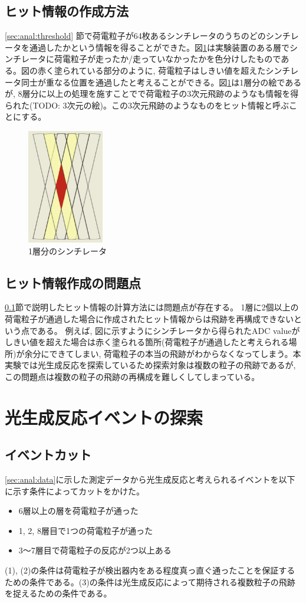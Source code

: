 \subsection{ヒット情報の作成方法}\label{subsec:anal:make_hit}
\ref{sec:anal:threshold} 節で荷電粒子が64枚あるシンチレータのうちのどのシンチレータを通過したかという情報を得ることができた。図\ref{fig:igata01}は実験装置のある層でシンチレータに荷電粒子が走ったか/走っていなかったかを色分けしたものである。図の赤く塗られている部分のように, 荷電粒子はしきい値を超えたシンチレータ同士が重なる位置を通過したと考えることができる。図\ref{fig:igata01}は1層分の絵であるが, 8層分に以上の処理を施すことでで荷電粒子の3次元飛跡のようなも情報を得られた(TODO: 3次元の絵)。この3次元飛跡のようなものをヒット情報と呼ぶことにする。
\begin{figure}[H]
    \centering
    \includegraphics[height=5.0cm]{img/igata_01.png}
    \caption{1層分のシンチレータ}
    \label{fig:igata01}
\end{figure}
\subsection{ヒット情報作成の問題点}
\ref{subsec:anal:make_hit}節で説明したヒット情報の計算方法には問題点が存在する。
1層に2個以上の荷電粒子が通過した場合に作成されたヒット情報からは飛跡を再構成できないという点である。
例えば, 図に示すようにシンチレータから得られたADC valueがしきい値を超えた場合は赤く塗られる箇所(荷電粒子が通過したと考えられる場所)が余分にできてしまい, 荷電粒子の本当の飛跡がわからなくなってしまう。本実験では光生成反応を探索しているため探索対象は複数の粒子の飛跡であるが, この問題点は複数の粒子の飛跡の再構成を難しくしてしまっている。

\section{光生成反応イベントの探索}
\subsection{イベントカット}\label{sec:anal:eventcut}
\ref{sec:anal:data}に示した測定データから光生成反応と考えられるイベントを以下に示す条件によってカットをかけた。
\begin{itemize}
    \item[(1)] 6層以上の層を荷電粒子が通った
    \item[(2)] 1, 2, 8層目で1つの荷電粒子が通った
    \item[(3)] 3〜7層目で荷電粒子の反応が2つ以上ある
\end{itemize}
(1), (2)の条件は荷電粒子が検出器内をある程度真っ直ぐ通ったことを保証するための条件である。(3)の条件は光生成反応によって期待される複数粒子の飛跡を捉えるための条件である。

